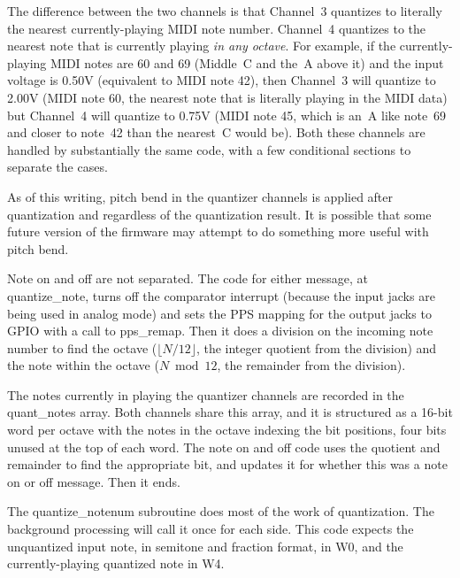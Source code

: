 The difference between the two channels is that Channel~3 quantizes to
literally the nearest currently-playing MIDI note number.  Channel~4
quantizes to the nearest note that is currently playing \emph{in any
octave}.  For example, if the currently-playing MIDI notes are 60 and 69
(Middle~C and the~A above it) and the input voltage is 0.50V (equivalent to
MIDI note 42), then Channel~3 will quantize to 2.00V (MIDI note 60, the
nearest note that is literally playing in the MIDI data) but Channel~4 will
quantize to 0.75V (MIDI note 45, which is an~A like note~69 and closer to
note~42 than the nearest~C would be).  Both these channels are handled by
substantially the same code, with a few conditional sections to separate the
cases.

As of this writing, pitch bend in the quantizer channels is applied after
quantization and regardless of the quantization result.  It is possible that
some future version of the firmware may attempt to do something more useful
with pitch bend.

Note on and off are not separated.  The code for either message, at
quantize\_note, turns off the comparator interrupt (because the input jacks
are being used in analog mode) and sets the PPS mapping for the output jacks
to GPIO with a call to pps\_remap.  Then it does a division on the incoming
note number to find the octave ($\lfloor N/12 \rfloor$, the integer quotient
from the division) and the note within the octave ($N \bmod 12$, the remainder
from the division).

The notes currently in playing the quantizer channels are recorded in the
quant\_notes array.  Both channels share this array, and it is structured as
a 16-bit word per octave with the notes in the octave indexing the bit
positions, four bits unused at the top of each word.  The note on and off
code uses the quotient and remainder to find the appropriate bit, and
updates it for whether this was a note on or off message.  Then it ends.

The quantize\_notenum subroutine does most of the work of quantization.
The background processing will call it once for each side.  This code
expects the unquantized input note, in semitone and fraction format, in W0,
and the currently-playing quantized note in W4.

